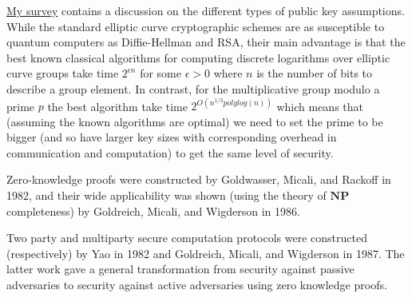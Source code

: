 \href{https://eccc.weizmann.ac.il/report/2017/065/}{My survey} contains
a discussion on the different types of public key assumptions. While the
standard elliptic curve cryptographic schemes are as susceptible to
quantum computers as Diffie-Hellman and RSA, their main advantage is
that the best known classical algorithms for computing discrete
logarithms over elliptic curve groups take time \(2^{\epsilon n}\) for
some \(\epsilon>0\) where \(n\) is the number of bits to describe a
group element. In contrast, for the multiplicative group modulo a prime
\(p\) the best algorithm take time \(2^{O(n^{1/3} polylog(n))}\) which
means that (assuming the known algorithms are optimal) we need to set
the prime to be bigger (and so have larger key sizes with corresponding
overhead in communication and computation) to get the same level of
security.

Zero-knowledge proofs were constructed by Goldwasser, Micali, and
Rackoff in 1982, and their wide applicability was shown (using the
theory of \(\mathbf{NP}\) completeness) by Goldreich, Micali, and
Wigderson in 1986.

Two party and multiparty secure computation protocols were constructed
(respectively) by Yao in 1982 and Goldreich, Micali, and Wigderson in
1987. The latter work gave a general transformation from security
against passive adversaries to security against active adversaries using
zero knowledge proofs.
